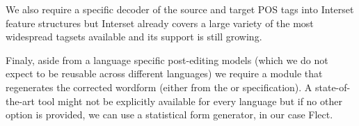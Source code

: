 We also require a specific decoder of the source and target POS tags into Interset feature
structures but Interset already covers a large variety of the most widespread tagsets available
and its support is still growing.

Finaly, aside from a language specific post-editing models (which we do not expect
to be reusable across different languages) we require a module that regenerates
the corrected wordform (either from the  or  specification).
A state-of-the-art tool might not be explicitly available for every language but if no
other option is provided, we can use a statistical form generator, in our case Flect.
